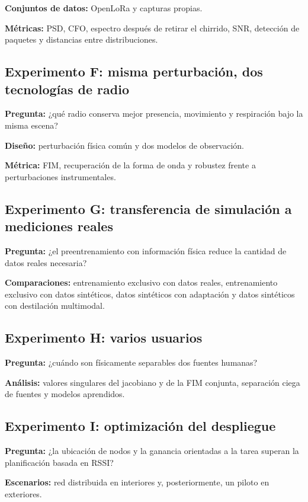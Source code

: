 \textbf{Conjuntos de datos:} OpenLoRa y capturas propias.

\textbf{Métricas:} PSD, CFO, espectro después de retirar el chirrido, SNR, detección de paquetes y distancias entre distribuciones.

\subsection{Experimento F: misma perturbación, dos tecnologías de radio}

\textbf{Pregunta:} ¿qué radio conserva mejor presencia, movimiento y respiración bajo la misma escena?

\textbf{Diseño:} perturbación física común y dos modelos de observación.

\textbf{Métrica:} FIM, recuperación de la forma de onda y robustez frente a perturbaciones instrumentales.

\subsection{Experimento G: transferencia de simulación a mediciones reales}

\textbf{Pregunta:} ¿el preentrenamiento con información física reduce la cantidad de datos reales necesaria?

\textbf{Comparaciones:} entrenamiento exclusivo con datos reales, entrenamiento exclusivo con datos sintéticos, datos sintéticos con adaptación y datos sintéticos con destilación multimodal.

\subsection{Experimento H: varios usuarios}

\textbf{Pregunta:} ¿cuándo son físicamente separables dos fuentes humanas?

\textbf{Análisis:} valores singulares del jacobiano y de la FIM conjunta, separación ciega de fuentes y modelos aprendidos.

\subsection{Experimento I: optimización del despliegue}

\textbf{Pregunta:} ¿la ubicación de nodos y la ganancia orientadas a la tarea superan la planificación basada en RSSI?

\textbf{Escenarios:} red distribuida en interiores y, posteriormente, un piloto en exteriores.

